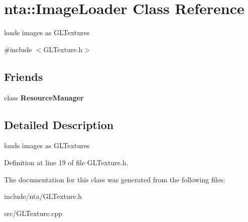 \hypertarget{classnta_1_1ImageLoader}{}\section{nta\+:\+:Image\+Loader Class Reference}
\label{classnta_1_1ImageLoader}


loads images as G\+L\+Textures  




{\ttfamily \#include $<$G\+L\+Texture.\+h$>$}

\subsection*{Friends}
\begin{DoxyCompactItemize}
\item 
\mbox{\label{classnta_1_1ImageLoader_a54c1252abc87a78a301e6b6984470408}} 
class {\bfseries Resource\+Manager}
\end{DoxyCompactItemize}


\subsection{Detailed Description}
loads images as G\+L\+Textures 

Definition at line 19 of file G\+L\+Texture.\+h.



The documentation for this class was generated from the following files\+:\begin{DoxyCompactItemize}
\item 
include/nta/G\+L\+Texture.\+h\item 
src/G\+L\+Texture.\+cpp\end{DoxyCompactItemize}
